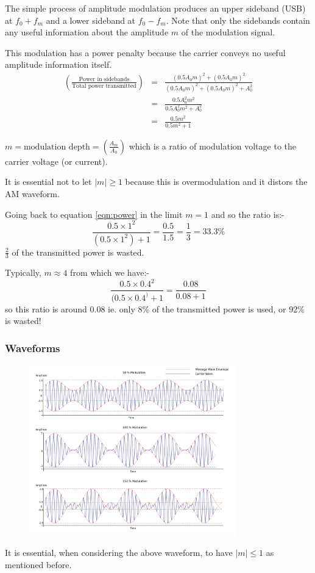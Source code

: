\documentclass[11pt]{article} %
\begin{document}

The simple process of amplitude modulation produces an upper sideband (USB) at $f_0+f_m$ and a lower sideband at $f_0-f_m$. Note that only the sidebands contain any useful information about the amplitude $m$ of the modulation signal.

This modulation has a power penalty because the carrier conveys no useful amplitude information itself.
\begin{eqnarray}
\left(\frac{\mbox{Power in sidebands}}{\mbox{Total power transmitted}}\right) &=& \frac{(0.5A_0m)^2+(0.5A_0m)^2}{(0.5A_0m)^2+(0.5A_0m)^2+A_0^2} \nonumber \\
&=& \frac{0.5A_0^2m^2}{0.5A_0^2m^2 + A_0^2} \nonumber \\
&=& \frac{0.5m^2}{0.5m^2+1}
\label{eqn:power}
\end{eqnarray}

$m = \mbox{modulation depth} = \left(\frac{A_m}{A_0}\right)$ which is a ratio of modulation voltage to the carrier voltage (or current).

It is essential not to let $|m|\ge 1$ because this is overmodulation and it distors the AM waveform.

Going back to equation \ref{eqn:power}  in the limit $m=1$ and so the ratio is:-
\begin{equation}
\frac{0.5\times 1^2}{(0.5\times 1^2)+1} = \frac{0.5}{1.5} = \frac{1}{3} = 33.3\%
\end{equation}
$\frac{2}{3}$ of the transmitted power is wasted.

Typically, $m\approx 4$ from which we have:-
\begin{equation}
\frac{0.5\times 0.4^2}{(0.5\times 0.4^)+1} = \frac{0.08}{0.08+1}
\end{equation}
so this ratio is around 0.08 ie. only 8\% of the transmitted power is used, or 92\% is wasted!

\subsubsection{Waveforms}
	\begin{figure}[h]
		\centering
		\includegraphics[width=0.8\textwidth]{modulatedwave}
	\end{figure}
It is essential, when considering the above waveform, to have $|m|\le 1$ as mentioned before.
\end{document}
